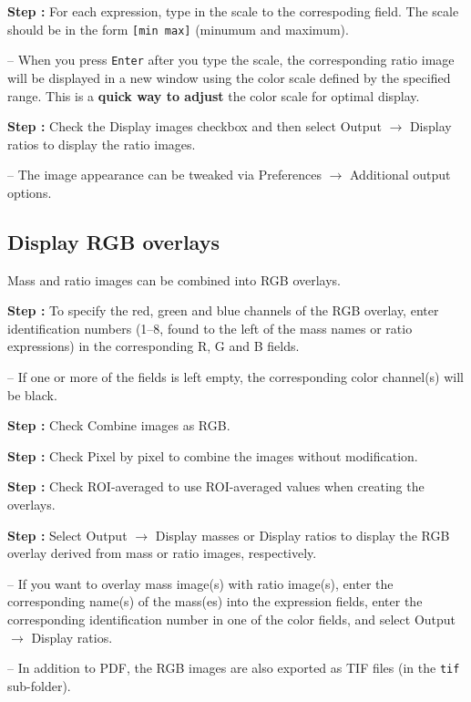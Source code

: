 \documentclass[a4paper, 11pt]{article}
\newcommand{\ttt}[1]{\texttt{#1}}
\newcommand{\lans}[1]{{\color{magenta}#1}}
\newcommand{\lanscb}[1]{{\color{darkgreen}#1}}
\newcommand{\lanstf}[1]{{\color{cyan}#1}}
\newcommand\ra{\rightarrow}
\newcommand\addon[1]{-- {\small #1}}
\newcounter{step}
\newcommand\s{\addtocounter{step}{1}\noindent\textbf{Step \thestep:}{ }}
\newcommand\bb[1]{\textbf{#1}}
\begin{document}
\s For each expression, type in the \lanstf{scale} to the correspoding field. The scale should be in the form \ttt{[min max]} (minumum and maximum).

\addon{When you press \ttt{Enter} after you type the scale, the corresponding ratio image will be displayed in a new window using the color scale defined by the specified range. This is a \bb{quick way to adjust} the color scale for optimal display.}

\s Check the \lanscb{Display images} checkbox and then select \lans{Output} $\ra$ \lans{Display ratios} to display the ratio images.

\addon{The image appearance can be tweaked via \lans{Preferences} $\ra$ \lans{Additional output options}.}


\subsection{Display RGB overlays}
\setcounter{step}{0}

Mass and ratio images can be combined into RGB overlays.

\s To specify the red, green and blue channels of the RGB overlay, enter identification numbers (1--8, found to the left of the mass names or ratio expressions) in the corresponding \lanstf{R}, \lanstf{G} and \lanstf{B} fields.

\addon{If one or more of the fields is left empty, the corresponding color channel(s) will be black.}

\s Check \lanscb{Combine images as RGB}.

\s Check \lanscb{Pixel by pixel} to combine the images without modification.

\s Check \lanscb{ROI-averaged} to use ROI-averaged values when creating the overlays.

\s Select \lans{Output} $\ra$ \lans{Display masses} or \lans{Display ratios} to display the RGB overlay derived from mass or ratio images, respectively.

\addon{If you want to overlay mass image(s) with ratio image(s), enter
the corresponding name(s) of the mass(es) into the \lanstf{expression} fields, enter the corresponding identification number in one of the \lanstf{color} fields, and select \lans{Output} $\ra$ \lans{Display ratios}.}

\addon{In addition to PDF, the RGB images are also exported as TIF files (in the \ttt{tif} sub-folder).}
\end{document}
